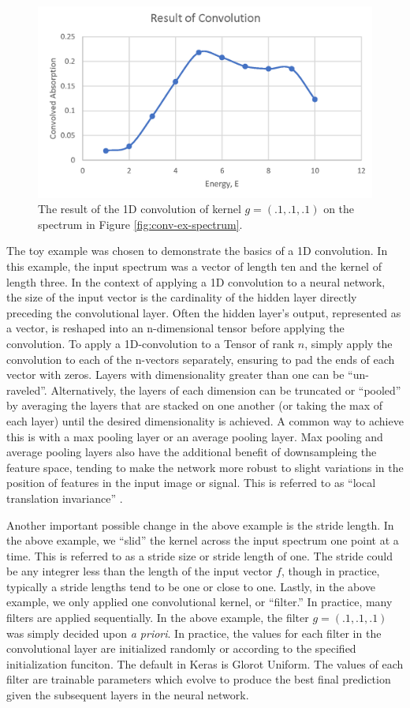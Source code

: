 \begin{figure}[h!]
    \label{fig:conv-res-spectrum}
    \centering
    \includegraphics[width=.75\linewidth]{Chapters/Figures/conv-example-res.png}
    \caption[1D Convolution Result]{The result of the 1D convolution of kernel $ g = (.1, .1, .1) $  on the spectrum in Figure \ref{fig:conv-ex-spectrum}.}
\end{figure}

The toy example was chosen to demonstrate the basics of a 1D convolution. In this example, the input spectrum was a vector of length ten and the kernel of length three. In the context of applying a 1D convolution to a neural network, the size of the input vector is the cardinality of the hidden layer directly preceding the convolutional layer. Often the hidden layer's output, represented as a vector, is reshaped into an n-dimensional tensor before applying the convolution. To apply a 1D-convolution to a Tensor of rank $ n $, simply apply the convolution to each of the n-vectors separately, ensuring to pad the ends of each vector with zeros. Layers with dimensionality greater than one can be ``un-raveled''. Alternatively, the layers of each dimension can be truncated or ``pooled'' by averaging the layers that are stacked on one another (or taking the max of each layer) until the desired dimensionality is achieved. A common way to achieve this is with a max pooling layer or an average pooling layer. Max pooling and average pooling layers also have the additional benefit of downsampleing the feature space, tending to make the network more robust to slight variations in the position of features in the input image or signal. This is referred to as ``local translation invariance'' \cite{local-translation-invariance}.

Another important possible change in the above example is the stride length. In the above example, we ``slid'' the kernel across the input spectrum one point at a time. This is referred to as a stride size or stride length of one. The stride could be any integrer less than the length of the input vector $ f $, though in practice, typically a stride lengths tend to be one or close to one. Lastly, in the above example, we only applied one convolutional kernel, or ``filter.'' In practice, many filters are applied sequentially. In the above example, the filter $ g = (.1, .1, .1) $ was simply decided upon \textit{a priori}. In practice, the values for each filter in the convolutional layer are initialized randomly or according to the specified initialization funciton. The default in Keras is Glorot Uniform. The values of each filter are trainable parameters which evolve to produce the best final prediction given the subsequent layers in the neural network.


